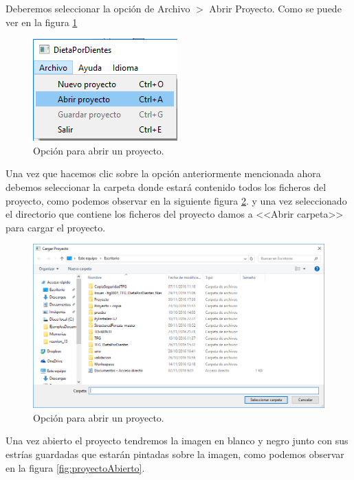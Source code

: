 \documentclass[13pt]{book}              %
\begin{document}
{Deberemos seleccionar la opción de Archivo  $>$ Abrir Proyecto. Como se puede ver en la figura \ref{fig:cargarPro}


\begin{figure}[h]
\centering
\includegraphics[width=.50\textwidth]{CargarProyecto}
\caption{Opción para abrir un proyecto.}
\label{fig:cargarPro}
\end{figure}

Una vez que hacemos clic sobre la opción anteriormente mencionada ahora debemos seleccionar la carpeta donde estará contenido todos los ficheros del proyecto, como podemos observar en la siguiente figura \ref{fig:selecCargarPro}. y una vez seleccionado el directorio que contiene los ficheros del proyecto damos a <<Abrir carpeta>> para cargar el proyecto. 



\begin{figure}[h]
\centering
\includegraphics[width=.99\textwidth]{selecCargarPro}
\caption{Opción para abrir un proyecto.}
\label{fig:selecCargarPro}
\end{figure}

Una vez abierto el proyecto tendremos la imagen en blanco y negro junto con sus estrías guardadas que estarán pintadas sobre la imagen, como podemos observar en la figura \ref{fig:proyectoAbierto}.


}
\end{document}
